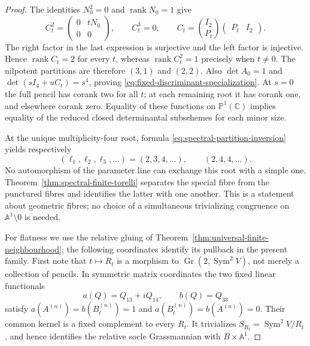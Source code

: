 \documentclass[11pt,reqno]{amsart}
\numberwithin{equation}{section}
\theoremstyle{definition}\newtheorem{definition}[theorem]{Definition}
\theoremstyle{remark}\newtheorem{remark}[theorem]{Remark}
\newcommand{\C}{\mathbb C}\newcommand{\Q}{\mathbb Q}
\newcommand{\Pj}{\mathbb P}\newcommand{\A}{\mathbb A}
\DeclareMathOperator{\Sym}{Sym}\DeclareMathOperator{\Gr}{Gr}
\DeclareMathOperator{\rank}{rank}\DeclareMathOperator{\Proj}{Proj}
\begin{document}
\begin{proof}
The identities \(N_0^2=0\) and \(\rank N_0=1\) give
\begin{equation}\label{eq:rank-preserving-power-identities}
 C_t^2=\begin{pmatrix}0&tN_0\\0&0\end{pmatrix},\qquad
 C_t^3=0,\qquad
 C_t=\binom{I_2}{P_t}\begin{pmatrix}P_t&I_2\end{pmatrix}.
\end{equation}
The right factor in the last expression is surjective and the left
factor is injective.  Hence \(\rank C_t=2\) for every \(t\),
whereas \(\rank C_t^2=1\) precisely when \(t\ne0\).
The nilpotent partitions are therefore \((3,1)\) and \((2,2)\).
Also \(\det A_0=1\) and \(\det(sI_4+uC_t)=s^4\),
proving \eqref{eq:fixed-discriminant-specialization}.  At \(s=0\)
the full pencil has corank two for all \(t\); at each remaining
root it has corank one, and elsewhere corank zero.  Equality of these
functions on \(\Pj^1(\C)\) implies equality of the reduced
closed determinantal subschemes for each minor size.

At the unique multiplicity-four root, formula
\eqref{eq:spectral-partition-inversion} yields respectively
\[
 (\ell_1,\ell_2,\ell_3,\ldots)=(2,3,4,\ldots),
 \qquad (2,4,4,\ldots).
\]
No automorphism of the parameter line can exchange this root with a
simple one.  Theorem~\ref{thm:spectral-finite-torelli} separates
the special fibre from the punctured fibres and identifies the latter
with one another.  This is a statement about geometric fibres; no
choice of a simultaneous trivializing congruence on \(\A^1\setminus0\)
is needed.

For flatness we use the relative gluing of
Theorem~\ref{thm:universal-finite-neighbourhood}; the following
coordinates identify its pullback in the present family.  First note that \(t\mapsto R_t\) is a morphism
to \(\Gr(2,\Sym^2V)\), not merely a collection of pencils.
In symmetric matrix coordinates the two fixed linear functionals
\[
 a(Q)=Q_{13}+iQ_{14},\qquad b(Q)=Q_{33}
\]
satisfy \(a(A^{(n)})=b(B_t^{(n)})=1\) and
\(a(B_t^{(n)})=b(A^{(n)})=0\).  Their common kernel is a
fixed complement to every \(R_t\).  It trivializes
\(S_{R_t}=\Sym^2V/R_t\), and hence identifies the relative
socle Grassmannian with \(B\times\A^1\).


\end{proof}
\end{document}

